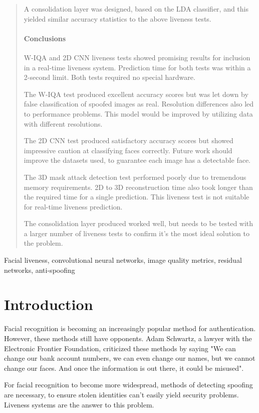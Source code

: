 \documentclass[12pt,a4paper]{article}
\begin{document}
\begin{abstract}
    A consolidation layer was designed, based on the LDA classifier, and this yielded similar accuracy statistics to the above liveness tests.
\paragraph{Conclusions}
    W-IQA and 2D CNN liveness tests showed promising results for inclusion in a real-time liveness system. Prediction time for both tests was within a 2-second limit. Both tests required no special hardware.

    The W-IQA test produced excellent accuracy scores but was let down by false classification of spoofed images as real. Resolution differences also led to performance problems. This model would be improved by utilizing data with different resolutions.

    The 2D CNN test produced satisfactory accuracy scores but showed impressive caution at classifying faces correctly. Future work should improve the datasets used, to guarantee each image has a detectable face.

    The 3D mask attack detection test performed poorly due to tremendous memory requirements. 2D to 3D reconstruction time also took longer than the required time for a single prediction. This liveness test is not suitable for real-time liveness prediction.

    The consolidation layer produced worked well, but needs to be tested with a larger number of liveness tests to confirm it's the most ideal solution to the problem.
\end{abstract}

\begin{keywords}
Facial liveness, convolutional neural networks, image quality metrics, residual networks, anti-spoofing
\end{keywords}

\section{Introduction}
    Facial recognition is becoming an increasingly popular method for authentication. However, these methods still have opponents. Adam Schwartz, a lawyer with the Electronic Frontier Foundation,  criticized these methods by saying "We can change our bank account numbers, we can even change our names, but we cannot change our faces.
    And once the information is out there, it could be misused". \cite{NPRArticle}

    For facial recognition to become more widespread, methods of detecting spoofing are necessary, to ensure stolen identities can't easily yield security problems. Liveness systems are the answer to this problem. 
\end{document}

